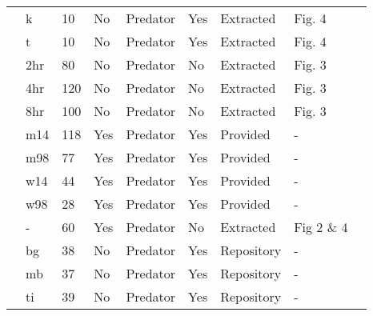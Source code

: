 \begin{longtable}{lllllllll}
\citet{Vahl:2005aa}&k&10&No&Predator&Yes&Extracted&Fig. 4&\citet{Novak:2020aa}\tabularnewline
\citet{Vahl:2005aa}&t&10&No&Predator&Yes&Extracted&Fig. 4&\citet{Novak:2020aa}\tabularnewline
\citet{Von-Westernhagen:1976aa}&2hr&80&No&Predator&No&Extracted&Fig. 3&\citet{Novak:2020aa}\tabularnewline
\citet{Von-Westernhagen:1976aa}&4hr&120&No&Predator&No&Extracted&Fig. 3&\citet{Novak:2020aa}\tabularnewline
\citet{Von-Westernhagen:1976aa}&8hr&100&No&Predator&No&Extracted&Fig. 3&\citet{Novak:2020aa}\tabularnewline
\citet{Vucetich:2002aa}&m14&118&Yes&Predator&Yes&Provided&-&\tabularnewline
\citet{Vucetich:2002aa}&m98&77&Yes&Predator&Yes&Provided&-&\tabularnewline
\citet{Vucetich:2002aa}&w14&44&Yes&Predator&Yes&Provided&-&\tabularnewline
\citet{Vucetich:2002aa}&w98&28&Yes&Predator&Yes&Provided&-&\tabularnewline
\citet{Walde:1984aa}&-&60&Yes&Predator&No&Extracted&Fig 2 \& 4&\citet{Novak:2020aa}\tabularnewline
\citet{Wasserman:2016aa}&bg&38&No&Predator&Yes&Repository&-&\citet{Wasserman:2016ab}\tabularnewline
\citet{Wasserman:2016aa}&mb&37&No&Predator&Yes&Repository&-&\citet{Wasserman:2016ab}\tabularnewline
\citet{Wasserman:2016aa}&ti&39&No&Predator&Yes&Repository&-&\citet{Wasserman:2016ab}\tabularnewline
\hline
\end{longtable}
